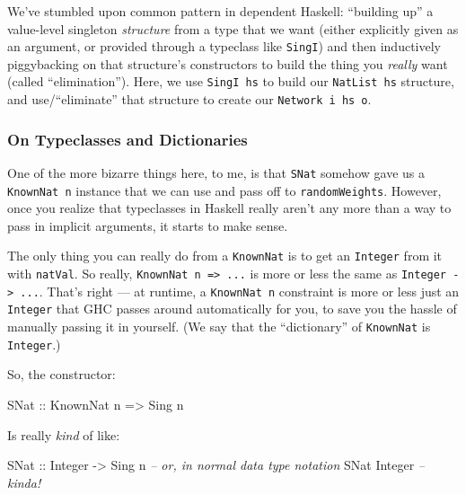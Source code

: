 \documentclass[]{article}
\newenvironment{Shaded}{}{}
\newcommand{\DataTypeTok}[1]{\textcolor[rgb]{0.56,0.13,0.00}{{#1}}}
\newcommand{\CommentTok}[1]{\textcolor[rgb]{0.38,0.63,0.69}{\textit{{#1}}}}
\newcommand{\OtherTok}[1]{\textcolor[rgb]{0.00,0.44,0.13}{{#1}}}
\newcommand{\NormalTok}[1]{{#1}}
\begin{document}
We've stumbled upon common pattern in dependent Haskell: ``building up'' a
value-level singleton \emph{structure} from a type that we want (either
explicitly given as an argument, or provided through a typeclass like
\texttt{SingI}) and then inductively piggybacking on that structure's
constructors to build the thing you \emph{really} want (called ``elimination'').
Here, we use \texttt{SingI\ hs} to build our \texttt{NatList\ hs} structure, and
use/``eliminate'' that structure to create our \texttt{Network\ i\ hs\ o}.

\subsubsection{On Typeclasses and
Dictionaries}\label{on-typeclasses-and-dictionaries}

One of the more bizarre things here, to me, is that \texttt{SNat} somehow gave
us a \texttt{KnownNat\ n} instance that we can use and pass off to
\texttt{randomWeights}. However, once you realize that typeclasses in Haskell
really aren't any more than a way to pass in implicit arguments, it starts to
make sense.

The only thing you can really do from a \texttt{KnownNat} is to get an
\texttt{Integer} from it with \texttt{natVal}. So really,
\texttt{KnownNat\ n\ =\textgreater{}\ ...} is more or less the same as
\texttt{Integer\ -\textgreater{}\ ...}. That's right --- at runtime, a
\texttt{KnownNat\ n} constraint is more or less just an \texttt{Integer} that
GHC passes around automatically for you, to save you the hassle of manually
passing it in yourself. (We say that the ``dictionary'' of \texttt{KnownNat} is
\texttt{Integer}.)

So, the constructor:

\begin{Shaded}
\begin{Highlighting}[]
\DataTypeTok{SNat}\OtherTok{ ::} \DataTypeTok{KnownNat} \NormalTok{n }\OtherTok{=>} \DataTypeTok{Sing} \NormalTok{n}
\end{Highlighting}
\end{Shaded}

Is really \emph{kind} of like:

\begin{Shaded}
\begin{Highlighting}[]
\DataTypeTok{SNat}\OtherTok{ ::} \DataTypeTok{Integer} \OtherTok{->} \DataTypeTok{Sing} \NormalTok{n}
\CommentTok{-- or, in normal data type notation}
\DataTypeTok{SNat} \DataTypeTok{Integer}
\CommentTok{-- kinda!}
\end{Highlighting}
\end{Shaded}
\end{document}

